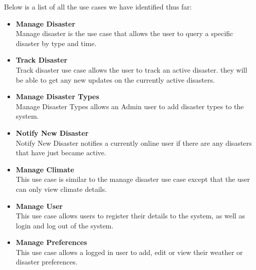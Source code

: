 Below is a list of all the use cases we have identified thus far:
\begin{itemize}%
	\item \textbf{Manage Disaster}\\ Manage disaster is the use case that allows the user to query a specific disaster by type and time.
	\item \textbf{Track Disaster} \\ Track disaster use case allows the user to track an active disaster. they will be able to get any new updates on the currently active disasters.
	\item \textbf{Manage Disaster Types} \\ Manage Disaster Types allows an Admin user to add disaster types to the system.
	\item \textbf{Notify New Disaster} \\ Notify New Disaster notifies a currently online user if there are any disasters that have just became active. 
	\item \textbf{Manage Climate} \\ This use case is similar to the manage disaster use case except that the user can only view climate details.
	\item \textbf{Manage User} \\ This use case allows users to register their details to the system, as well as login and log out of the system.
	\item \textbf{Manage Preferences} \\ This use case allows a logged in user to add, edit or view their weather or disaster preferences.
\end{itemize}